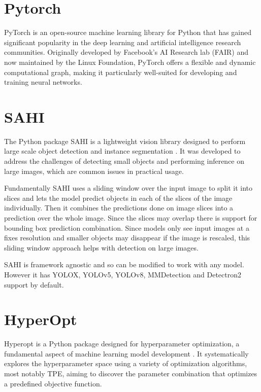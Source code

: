 \documentclass[10pt]{book}
\begin{document}
\section{Pytorch}

PyTorch is an open-source machine learning library for Python that has gained significant popularity in the deep learning and artificial intelligence research communities. Originally developed by Facebook's AI Research lab (FAIR) and now maintained by the Linux Foundation, PyTorch offers a flexible and dynamic computational graph, making it particularly well-suited for developing and training neural networks.

\section{SAHI}

The Python package \ac{SAHI} is a lightweight vision library designed to perform large scale object detection and instance segmentation \cite{akyon2022sahi,obss2021sahi}. It was developed to address the challenges of detecting small objects and performing inference on large images, which are common issues in practical usage. 

Fundamentally \ac{SAHI} uses a sliding window over the input image to split it into slices and lets the model predict objects in each of the slices of the image individually. Then it combines the predictions done on image slices into a prediction over the whole image. Since the slices may overlap there is support for bounding box prediction combination. Since models only see input images at a fixes resolution and smaller objects may disappear if the image is rescaled, this sliding window approach helps with detection on large images. 

\ac{SAHI} is framework agnostic and so can be modified to work with any model. However it has YOLOX, YOLOv5, YOLOv8, MMDetection and Detectron2 support by default.

\section{HyperOpt}

Hyperopt is a Python package designed for hyperparameter optimization, a fundamental aspect of machine learning model development \cite{bergstra2013making}. It systematically explores the hyperparameter space using a variety of optimization algorithms, most notably \ac{TPE}, aiming to discover the parameter combination that optimizes a predefined objective function. 
\end{document}
